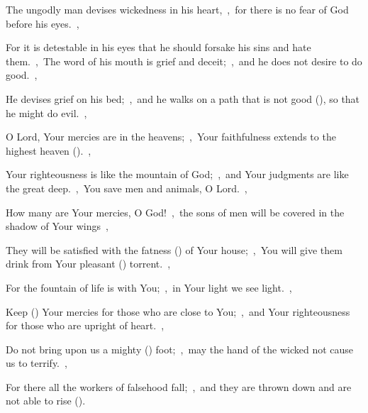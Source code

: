 \documentclass[12pt,twoside,a5paper]{article}
\begin{document}
\begin{normalparskip}
  The ungodly man devises wickedness in his heart,~\sep\ for there is no fear of God before his eyes.~\sep


  For it is detestable in his eyes that he should forsake his sins and hate them.~\sep\ The word of his mouth is grief and deceit;~\sep\ and he does not desire to do good.~\sep

  He devises grief on his bed;~\sep\ and he walks on a path that is not good (), so that he might do evil.~\sep

  O Lord, Your mercies are in the heavens;~\sep\ Your faithfulness extends to the highest heaven ().~\sep

  Your righteousness is like the mountain of God;~\sep\ and Your judgments are like the great deep.~\sep\ You save men and animals, O Lord.~\sep

  How many are Your mercies, O God!~\sep\ the sons of men will be covered in the shadow of Your wings~\sep

  They will be satisfied with the fatness () of Your house;~\sep\ You will give them drink from Your pleasant () torrent.~\sep

  For the fountain of life is with You;~\sep\ in Your light we see light.~\sep

  Keep () Your mercies for those who are close to You;~\sep\ and Your righteousness for those who are upright of heart.~\sep

  Do not bring upon us a mighty () foot;~\sep\ may the hand of the wicked not cause us to terrify.~\sep

  For there all the workers of falsehood fall;~\sep\ and they are thrown down and are not able to rise ().
\end{normalparskip}




\end{document}
